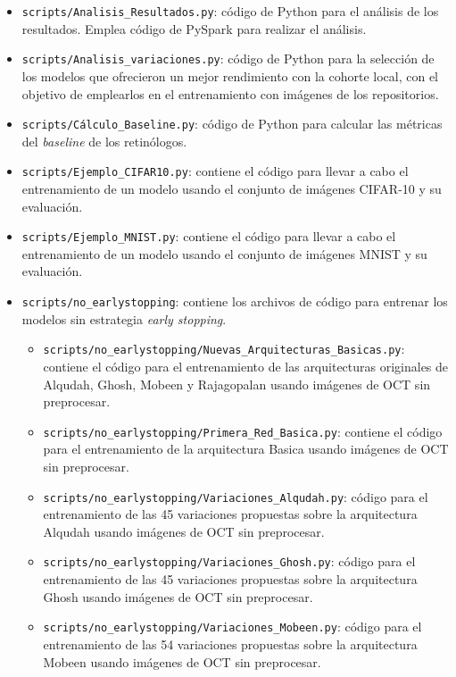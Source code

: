 \begin{itemize}
\begin{itemize}
    \item \texttt{scripts/Analisis\_Resultados.py}: código de Python para el análisis de los resultados. Emplea código de PySpark para realizar el análisis.
    \item \texttt{scripts/Analisis\_variaciones.py}: código de Python para la selección de los modelos que ofrecieron un mejor rendimiento con la cohorte local, con el objetivo de emplearlos en el entrenamiento con imágenes de los repositorios.
    \item \texttt{scripts/Cálculo\_Baseline.py}: código de Python para calcular las métricas del \textit{baseline} de los retinólogos.
    \item \texttt{scripts/Ejemplo\_CIFAR10.py}: contiene el código para llevar a cabo el entrenamiento de un modelo usando el conjunto de imágenes CIFAR-10 y su evaluación.
    \item \texttt{scripts/Ejemplo\_MNIST.py}: contiene el código para llevar a cabo el entrenamiento de un modelo usando el conjunto de imágenes MNIST y su evaluación.
    \item \texttt{scripts/no\_earlystopping}: contiene los archivos de código para entrenar los modelos sin estrategia \textit{early stopping}.
    \begin{itemize}
        \item \texttt{scripts/no\_earlystopping/Nuevas\_Arquitecturas\_Basicas.py}: contiene el código para el entrenamiento de las arquitecturas originales de Alqudah, Ghosh, Mobeen y Rajagopalan usando imágenes de OCT sin preprocesar.
        \item \texttt{scripts/no\_earlystopping/Primera\_Red\_Basica.py}: contiene el código para el entrenamiento de la arquitectura Basica usando imágenes de OCT sin preprocesar.
        \item \texttt{scripts/no\_earlystopping/Variaciones\_Alqudah.py}: código para el entrenamiento de las 45 variaciones propuestas sobre la arquitectura Alqudah usando imágenes de OCT sin preprocesar.
        \item \texttt{scripts/no\_earlystopping/Variaciones\_Ghosh.py}: código para el entrenamiento de las 45 variaciones propuestas sobre la arquitectura Ghosh usando imágenes de OCT sin preprocesar.
        \item \texttt{scripts/no\_earlystopping/Variaciones\_Mobeen.py}: código para el entrenamiento de las 54 variaciones propuestas sobre la arquitectura Mobeen usando imágenes de OCT sin preprocesar.

\end{itemize}
\end{itemize}
\end{itemize}
